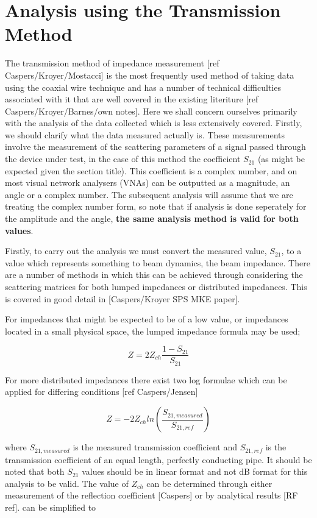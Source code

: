 \section{Analysis using the Transmission Method}

The transmission method of impedance measurement [ref Caspers/Kroyer/Mostacci] is the most frequently used method of taking data using the coaxial wire technique and has a number of technical difficulties associated with it that are well covered in the existing literiture [ref Caspers/Kroyer/Barnes/own notes]. Here we shall concern ourselves primarily with the analysis of the data collected which is less extensively covered. Firstly, we should clarify what the data measured actually is. These measurements involve the measurement of the scattering parameters of a signal passed through the device under test, in the case of this method the coefficient $S_{21}$ (as might be expected given the section title). This coefficient is a complex number, and on most visual network analysers (VNAs) can be outputted as a magnitude, an angle or a complex number. The subsequent analysis will assume that we are treating the complex number form, so note that if analysis is done seperately for the amplitude and the angle, \textbf{the same analysis method is valid for both values}. 

Firstly, to carry out the analysis we must convert the measured value, $S_{21}$, to a value which represents something to beam dynamics, the beam impedance. There are a number of methods in which this can be achieved through considering the scattering matrices for both lumped impedances or distributed impedances. This is covered in good detail in [Caspers/Kroyer SPS MKE paper].

For impedances that might be expected to be of a low value, or impedances located in a small physical space, the lumped impedance formula may be used; 

\begin{equation}
Z = 2Z_{ch} \frac{1-S_{21}}{S_{21}}
\end{equation}

For more distributed impedances there exist two log formulae which can be applied for differing conditions [ref Caspers/Jensen]

\begin{equation}
Z = -2Z_{ch}ln\left(\frac{S_{21,measured}}{S_{21,ref}} \right)
\label{eqn:log-form}
\end{equation}

where $S_{21,measured}$ is the measured transmission coefficient and $S_{21,ref}$ is the transmission coefficient of an equal length, perfectly conducting pipe. It should be noted that both $S_{21}$ values should be in linear format and not dB format for this analysis to be valid. The value of $Z_{ch}$ can be determined through either measurement of the reflection coefficient [Caspers] or by analytical results [RF ref].  can be simplified to

